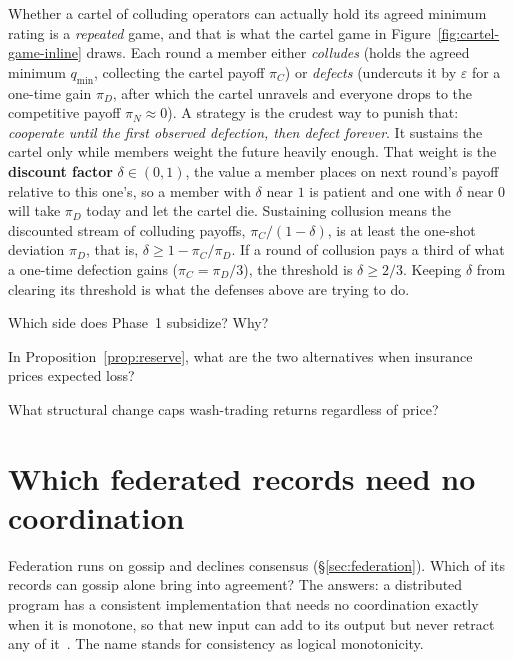 \documentclass[11pt,a4paper]{article}
\theoremstyle{definition}
\theoremstyle{definition}
\theoremstyle{remark}
\begin{document}
Whether a cartel of colluding operators can actually hold its agreed minimum
rating is a \emph{repeated} game, and that is what \ifpdbook the cartel game in \else Figure~\ref{fig:cartel-game-inline}\fi{} draws.
Each round a member either \emph{colludes} (holds the agreed minimum
$q_{\min}$, collecting the cartel payoff $\pi_C$) or \emph{defects}
(undercuts it by $\varepsilon$ for a one-time gain $\pi_D$, after which the
cartel unravels and everyone drops to the competitive payoff $\pi_N \approx 0$). A
 strategy is the crudest way to punish that: \emph{cooperate
until the first observed defection, then defect forever}. It sustains the cartel
only while members weight the future heavily enough. That weight is the
\textbf{discount factor} $\delta \in (0,1)$, the value a member places on next
round's payoff relative to this one's, so a member with $\delta$ near $1$ is patient
and one with $\delta$ near $0$ will take $\pi_D$ today and let the cartel die.
Sustaining collusion means the discounted stream of colluding payoffs,
$\pi_C/(1-\delta)$, is at least the one-shot deviation $\pi_D$, that is,
$\delta\ge 1-\pi_C/\pi_D$. If a round of collusion pays a third of what a
one-time defection gains ($\pi_C=\pi_D/3$), the threshold is $\delta\ge 2/3$. Keeping $\delta$ from clearing its threshold is what the
defenses above are trying to do.

\pdexercisepointer*{\ref{ex:he-phase1-subsidize}}{\ref{ex:he-poa-resale-reframe}}{\pageref{ex:he-phase1-subsidize}}

\begin{pdrecitation}
\item Which side does Phase~1 subsidize? Why?
\item In Proposition~\ref{prop:reserve}, what are the two alternatives when insurance prices expected loss?
\item What structural change caps wash-trading returns regardless of price?
\end{pdrecitation}

\section{Which federated records need no coordination}\label{sec:he-calm}

Federation runs on gossip and declines consensus (\S\ref{sec:federation}).
Which of its records can gossip alone bring into agreement? The
 answers: a distributed program has a consistent
implementation that needs no coordination exactly when it is monotone, so
that new input can add to its output but never retract any of
it~. The name stands for
consistency as logical monotonicity.
\end{document}

